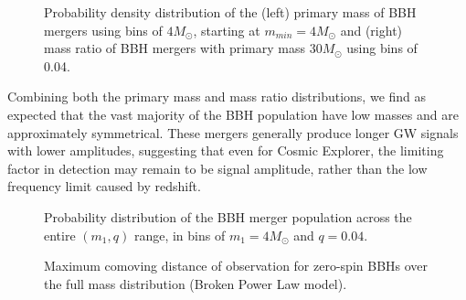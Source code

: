 \documentclass{article}
\begin{document}
\begin{figure}[!htb]
    \caption{\label{fig:hist} Probability density distribution of the (left) primary mass of BBH mergers using bins of $4 M_\odot$, starting at $m_{min} = 4 M_\odot$ and (right) mass ratio of BBH mergers with primary mass $30 M_\odot$ using bins of 0.04.}
\end{figure}

Combining both the primary mass and mass ratio distributions, we find as expected that the vast majority of the BBH population have low masses and are approximately symmetrical. These mergers generally produce longer GW signals with lower amplitudes, suggesting that even for Cosmic Explorer, the limiting factor in detection may remain to be signal amplitude, rather than the low frequency limit caused by redshift. 

\begin{figure}[!htb]
    \caption{\label{fig:hist} Probability distribution of the BBH merger population across the entire $(m_1, q)$ range, in bins of $m_1 = 4 M_\odot$ and $q = 0.04$.}
\end{figure}

\begin{figure}[!htb]
    \caption{\label{fig:hist} Maximum comoving distance of observation for zero-spin BBHs over the full mass distribution (Broken Power Law model).}
\end{figure}
\end{document}
